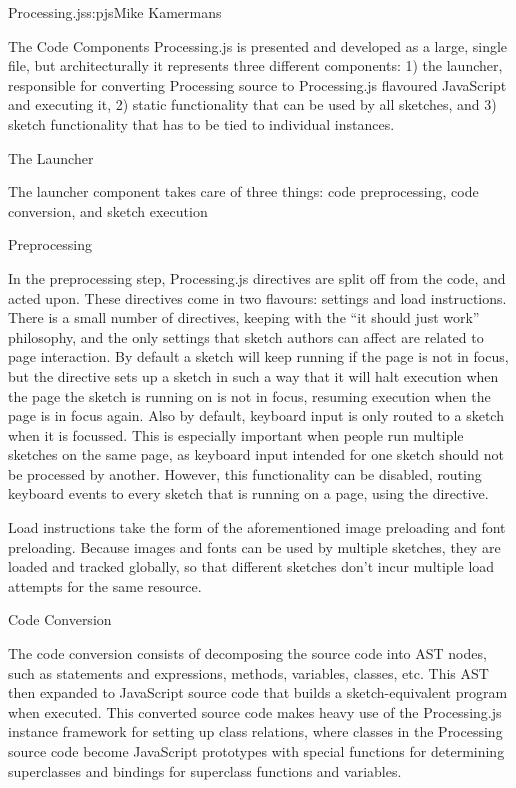 \begin{aosachapter}{Processing.js}{s:pjs}{Mike Kamermans}
\begin{aosasect1}{The Code Components}
Processing.js is presented and developed as a large, single file, but
architecturally it represents three different components: 1) the
launcher, responsible for converting Processing source to
Processing.js flavoured JavaScript and executing it, 2) static
functionality that can be used by all sketches, and 3) sketch
functionality that has to be tied to individual instances.

\begin{aosasect2}{The Launcher}

The launcher component takes care of three things: code preprocessing,
code conversion, and sketch execution

\begin{aosasect3}{Preprocessing}

In the preprocessing step, Processing.js directives are split off from
the code, and acted upon. These directives come in two flavours:
settings and load instructions. There is a small number of directives,
keeping with the ``it should just work'' philosophy, and the only
settings that sketch authors can affect are related to page
interaction. By default a sketch will keep running if the page is not
in focus, but the  directive sets up a sketch in
such a way that it will halt execution when the page the sketch is
running on is not in focus, resuming execution when the page is in
focus again. Also by default, keyboard input is only routed to a
sketch when it is focussed. This is especially important when people
run multiple sketches on the same page, as keyboard input intended for
one sketch should not be processed by another. However, this
functionality can be disabled, routing keyboard events to every sketch
that is running on a page, using the  directive.

Load instructions take the form of the aforementioned image preloading
and font preloading. Because images and fonts can be used by multiple
sketches, they are loaded and tracked globally, so that different
sketches don't incur multiple load attempts for the same resource.

\end{aosasect3}

\begin{aosasect3}{Code Conversion}

The code conversion consists of decomposing the source code into AST
nodes, such as statements and expressions, methods, variables,
classes, etc. This AST then expanded to JavaScript source code that
builds a sketch-equivalent program when executed. This converted
source code makes heavy use of the Processing.js instance framework
for setting up class relations, where classes in the Processing source
code become JavaScript prototypes with special functions for
determining superclasses and bindings for superclass functions and
variables.


\end{aosasect3}
\end{aosasect2}
\end{aosasect1}
\end{aosachapter}
